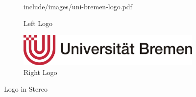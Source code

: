 \begin{figure}[ht]
	\centering
	\begin{subfigure}[t]{0.49\columnwidth}
		\centering
		\begin{overpic}[width=\textwidth]{include/images/uni-bremen-logo.pdf}
		\end{overpic}
		\caption{Left Logo}
		\label{fig:logo-left}
	\end{subfigure}
	\hspace*{\fill}
	\begin{subfigure}[t]{0.49\columnwidth}
		\centering
		\includegraphics[width=\textwidth]{include/images/uni-bremen-logo.pdf}
		\caption{Right Logo}
		\label{fig:logo-right}
	\end{subfigure}
	\caption{Logo in Stereo}
	\label{fig:logo-stereo}
\end{figure}